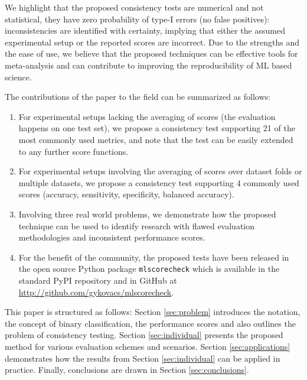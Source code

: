 \documentclass[5p, final]{elsarticle}
\begin{document}
We highlight that the proposed consistency tests are numerical and not statistical, they have zero probability of type-I errors (no false positives): inconsistencies are identified with certainty, implying that either the assumed experimental setup or the reported scores are incorrect. Due to the strengths and the ease of use, we believe that the proposed techniques can be effective tools for meta-analysis and can contribute to improving the reproducibility of ML based science.

The contributions of the paper to the field can be summarized as follows:
\begin{enumerate}
\item For experimental setups lacking the averaging of scores (the evaluation happens on one test set), we propose a consistency test supporting 21 of the most commonly used metrics, and note that the test can be easily extended to any further score functions.
\item For experimental setups involving the averaging of scores over dataset folds or multiple datasets, we propose a consistency test supporting 4 commonly used scores (accuracy, sensitivity, specificity, balanced accuracy).
\item Involving three real world problems, we demonstrate how the proposed technique can be used to identify research with flawed evaluation methodologies and inconsistent performance scores.
\item For the benefit of the community, the proposed tests have been released in the open source Python package \verb|mlscorecheck| which is available in the standard PyPI repository and in GitHub at \url{http://github.com/gykovacs/mlscorecheck}.
\end{enumerate}

This paper is structured as follows: Section \ref{sec:problem} introduces the notation, the concept of binary classification, the performance scores and also outlines the problem of consistency testing. Section \ref{sec:individual} presents the proposed method for various evaluation schemes and scenarios. Section \ref{sec:applications} demonstrates how the results from Section \ref{sec:individual} can be applied in practice. Finally, conclusions are drawn in Section \ref{sec:conclusions}.

\end{document}

